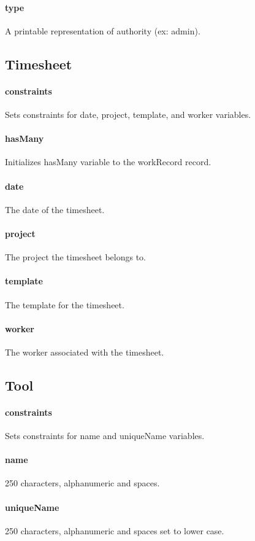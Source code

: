 \documentclass[12pt]{article}
\begin{document}
\paragraph{type} A printable representation of authority (ex: admin).

\setcounter{paragraph}{0}
\subsection{Timesheet}\label{sec:DTimesheet}
\paragraph{constraints} Sets constraints for date, project, template, and worker variables.
\paragraph{hasMany} Initializes hasMany variable to the workRecord record.
\paragraph{date} The date of the timesheet.
\paragraph{project} The project the timesheet belongs to.
\paragraph{template} The template for the timesheet.
\paragraph{worker} The worker associated with the timesheet.

\setcounter{paragraph}{0}
\subsection{Tool}\label{sec:DTool}
\paragraph{constraints} Sets constraints for name and uniqueName variables.
\paragraph{name} 250 characters, alphanumeric and spaces.
\paragraph{uniqueName} 250 characters, alphanumeric and spaces  set to lower case.
\end{document}
